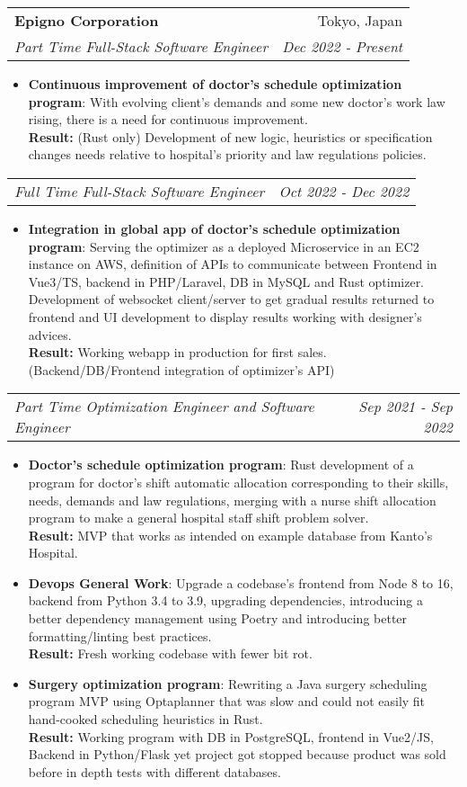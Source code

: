 \documentclass[letterpaper,11pt]{article}
\makeatletter
\newcommand{\resumeItem}[2]{
  \item\small{
    \textbf{#1}{: #2 \vspace{-2pt}}
  }
}
\newcommand{\resumeSubheading}[4]{
  \vspace{-1pt}\item
    \begin{tabular*}{0.97\textwidth}[t]{l@{\extracolsep{\fill}}r}
      \textbf{#1} & #2 \\
      \textit{\small#3} & \textit{\small #4} \\
    \end{tabular*}\vspace{-5pt}
}
\newcommand{\resumeSubSubheading}[2]{
    \begin{tabular*}{0.97\textwidth}{l@{\extracolsep{\fill}}r}
      \textit{\small#1} & \textit{\small #2} \\
    \end{tabular*}\vspace{-5pt}
}
\newcommand{\resumeItemListStart}{\begin{itemize}}
\newcommand{\resumeItemListEnd}{\end{itemize}\vspace{-5pt}}
\makeatother
\begin{document}
    \resumeSubheading
      {Epigno Corporation}{Tokyo, Japan}
      {Part Time Full-Stack Software Engineer}{Dec 2022 - Present}
      \resumeItemListStart
       \resumeItem{Continuous improvement of doctor's schedule optimization program}
         {With evolving client's demands and some new doctor's work law rising, there is a need for continuous improvement.
         \\\textbf{Result:} (Rust only) Development of new logic, heuristics or specification changes needs relative to hospital's priority and law regulations policies.}
      \resumeItemListEnd
      \pagebreak
   \resumeSubSubheading
      {Full Time Full-Stack Software Engineer}{Oct 2022 - Dec 2022}
      \resumeItemListStart
       \resumeItem{Integration in global app of doctor's schedule optimization program}
         {Serving the optimizer as a deployed Microservice in an EC2 instance on AWS, definition of APIs to communicate between Frontend in Vue3/TS, backend in PHP/Laravel, DB in MySQL and Rust optimizer. Development of websocket client/server to get gradual results returned to frontend and UI development to display results working with designer's advices.
         \\\textbf{Result:} Working webapp in production for first sales. (Backend/DB/Frontend integration of optimizer's API)}
      \resumeItemListEnd
   \resumeSubSubheading
    {Part Time Optimization Engineer and Software Engineer}{Sep 2021 - Sep 2022}
    \resumeItemListStart
       \resumeItem{Doctor's schedule optimization program}
         {Rust development of a program for doctor's shift automatic allocation corresponding to their skills, needs, demands and law regulations, merging with a nurse shift allocation program to make a general hospital staff shift problem solver.
         \\\textbf{Result:} MVP that works as intended on example database from Kanto's Hospital.}
       \resumeItem{Devops General Work}
         {Upgrade a codebase's frontend from Node 8 to 16, backend from Python 3.4 to 3.9, upgrading dependencies, introducing a better dependency management using Poetry and introducing better formatting/linting best practices.
         \\\textbf{Result:} Fresh working codebase with fewer bit rot.}
       \resumeItem{Surgery optimization program}
         {Rewriting a Java surgery scheduling program MVP using Optaplanner that was slow and could not easily fit hand-cooked scheduling heuristics in Rust.
         \\\textbf{Result:} Working program with DB in PostgreSQL, frontend in Vue2/JS, Backend in Python/Flask yet project got stopped because product was sold before in depth tests with different databases.}
    \resumeItemListEnd
\end{document}
